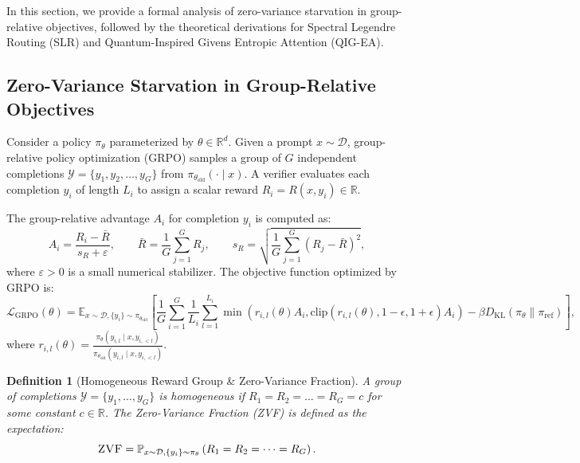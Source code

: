 \documentclass{article}
\newtheorem{definition}{Definition}
\newcommand{\grpo}{\textsc{GRPO}\xspace}
\newcommand{\zvf}{\textsc{ZVF}\xspace}
\newcommand{\slr}{\textsc{SLR}\xspace}
\newcommand{\qigea}{\textsc{QIG-EA}\xspace}
\newcommand{\E}{\mathbb{E}}
\begin{document}
In this section, we provide a formal analysis of zero-variance starvation in group-relative objectives, followed by the theoretical derivations for Spectral Legendre Routing (\slr) and Quantum-Inspired Givens Entropic Attention (\qigea).

\subsection{Zero-Variance Starvation in Group-Relative Objectives}
\label{subsec:zvf_formulation}

Consider a policy $\pi_\theta$ parameterized by $\theta \in \mathbb{R}^d$. Given a prompt $x \sim \mathcal{D}$, group-relative policy optimization (\grpo) samples a group of $G$ independent completions $\mathcal{Y} = \{y_1, y_2, \dots, y_G\}$ from $\pi_{\theta_{\text{old}}}(\cdot \mid x)$. A verifier evaluates each completion $y_i$ of length $L_i$ to assign a scalar reward $R_i = R(x, y_i) \in \mathbb{R}$.

The group-relative advantage $A_i$ for completion $y_i$ is computed as:
\begin{equation}
  A_i = \frac{R_i - \bar{R}}{s_R + \varepsilon}, \qquad \bar{R} = \frac{1}{G}\sum_{j=1}^G R_j, \qquad s_R = \sqrt{\frac{1}{G}\sum_{j=1}^G (R_j - \bar{R})^2},
  \label{eq:grpo_advantage}
\end{equation}
where $\varepsilon > 0$ is a small numerical stabilizer. The objective function optimized by \grpo is:
\begin{equation}
  \mathcal{L}_{\text{GRPO}}(\theta) = \E_{x \sim \mathcal{D}, \{y_i\} \sim \pi_{\theta_{\text{old}}}} \left[ \frac{1}{G} \sum_{i=1}^G \frac{1}{L_i} \sum_{l=1}^{L_i} \min \left( r_{i,l}(\theta) A_i, \text{clip}(r_{i,l}(\theta), 1-\epsilon, 1+\epsilon) A_i \right) - \beta D_{\text{KL}}(\pi_\theta \| \pi_{\text{ref}}) \right],
  \label{eq:grpo_loss}
\end{equation}
where $r_{i,l}(\theta) = \frac{\pi_\theta(y_{i,l} \mid x, y_{i,<l})}{\pi_{\theta_{\text{old}}}(y_{i,l} \mid x, y_{i,<l})}$.

\begin{definition}[Homogeneous Reward Group \& Zero-Variance Fraction]
A group of completions $\mathcal{Y} = \{y_1, \dots, y_G\}$ is homogeneous if $R_1 = R_2 = \dots = R_G = c$ for some constant $c \in \mathbb{R}$. The Zero-Variance Fraction (\zvf) is defined as the expectation:
\begin{equation}
  \text{\zvf} = \mathbb{P}_{x \sim \mathcal{D}, \{y_i\} \sim \pi_\theta} \left( R_1 = R_2 = \dots = R_G \right).
  \label{eq:zvf_def}
\end{equation}
\end{definition}
\end{document}
